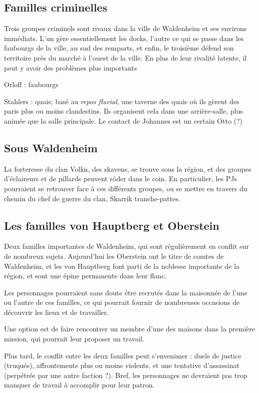 \documentclass[10pt,a4paper]{book}
\begin{document}
\subsection{Familles criminelles}
Trois groupes criminels sont rivaux dans la ville de Waldenheim et ses environs immédiats. L'un gère essentiellement les docks, l'autre ce qui se passe dans les faubourgs de la ville, au sud des remparts, et enfin, le troisième défend son territoire près du marché à l'ouest de la ville. En plus de leur rivalité latente, il peut y avoir des problèmes plus importants

Orloff : faubourgs

Stahlers : quais; basé  au \emph{repos fluvial}, une taverne des quais où ils gèrent des paris plus ou moins clandestins. Ils organisent cela dans une arrière-salle, plus animée que la salle principale. Le contact de Johannes est un certain Otto (?)
\subsection{Sous Waldenheim}
La forteresse du clan Volkn, des skavens, se trouve sous la région, et des groupes d'éclaireurs et de pillards peuvent rôder dans le coin. En particulier, les PJs pourraient se retrouver face à ces différents groupes, ou se mettre en travers du chemin du chef de guerre du clan, Skarrik tranche-pattes.
\subsection{Les familles von Hauptberg et Oberstein}

Deux familles importantes de Waldenheim, qui sont régulièrement en conflit sur de nombreux sujets. Aujourd'hui les Oberstein ont le titre de comtes de Waldenheim, et les von Hauptberg font parti de la noblesse importante de la région, et sont une épine permanente dans leur flanc.

Les personnages pourraient sans doute être recrutés dans la maisonnée de l'une ou l'autre de ces familles, ce qui pourrait fournir de nombreuses occasions de découvrir les lieux et de travailler.

Une option est de faire rencontrer un membre d'une des maisons dans la première mission, qui pourrait leur proposer un travail.

Plus tard, le conflit entre les deux familles peut s'envenimer : duels de justice (truqués), affrontements plus ou moins violents, et une tentative d'assassinat (perpétrée par une autre faction ?). Bref, les personnages ne devraient pas trop manquer de travail à accomplir pour leur patron.
\end{document}
